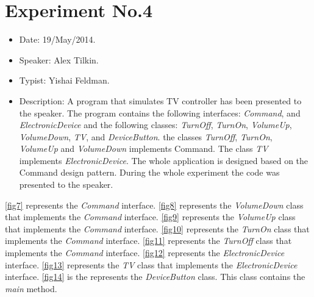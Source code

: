\section{Experiment No.4}
\begin{itemize}
	\item Date: 19/May/2014.
	\item Speaker: Alex Tilkin.
	\item Typist: Yishai Feldman.
	\item Description: A program that simulates TV controller has been presented to the speaker. The program contains the following interfaces: \textit{Command}, and \textit{ElectronicDevice} and the following classes: \textit{TurnOff}, \textit{TurnOn}, \textit{VolumeUp}, \textit{VolumeDown}, \textit{TV}, and \textit{DeviceButton}. the classes \textit{TurnOff}, \textit{TurnOn}, \textit{VolumeUp} and \textit{VolumeDown} implements Command. The class \textit{TV} implements \textit{ElectronicDevice}. The whole application is designed based on the Command design pattern. During the whole experiment the code was presented to the speaker.
\end{itemize}
\autoref{fig7} represents the \textit{Command} interface. \autoref{fig8} represents the \textit{VolumeDown} class that implements the \textit{Command} interface. \autoref{fig9} represents the \textit{VolumeUp} class that implements the \textit{Command} interface. \autoref{fig10} represents the \textit{TurnOn} class that implements the \textit{Command} interface. \autoref{fig11} represents the \textit{TurnOff} class that implements the \textit{Command} interface. \autoref{fig12} represents the \textit{ElectronicDevice} interface. \autoref{fig13} represents the \textit{TV} class that implements the \textit{ElectronicDevice} interface. \autoref{fig14} is the represents the \textit{DeviceButton} class. This class contains the \textit{main} method.

